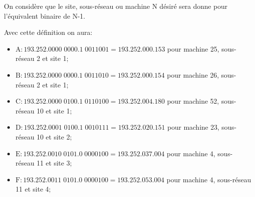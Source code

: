 \documentclass{article}
\begin{document}
\begin{resolution}
\begin{definition}
    \end{definition}
    \begin{remark}
        On considère que le site, sous-réseau ou machine N désiré sera donne pour l'équivalent binaire de N-1.
    \end{remark}
    Avec cette définition on aura:
    \begin{itemize}[noitemsep]
        \item $\boxed{\text{A} : 193.252.0000\;0000.1\;0011001 = 193.252.000.153}$ pour machine 25, sous-réseau 2 et site 1;
        \item $\boxed{\text{B} : 193.252.0000\;0000.1\;0011010 = 193.252.000.154}$ pour machine 26, sous-réseau 2 et site 1;
        \item $\boxed{\text{C} : 193.252.0000\;0100.1\;0110100 = 193.252.004.180}$ pour machine 52, sous-réseau 10 et site 1;
        \item $\boxed{\text{D} : 193.252.0001\;0100.1\;0010111 = 193.252.020.151}$ pour machine 23, sous-réseau 10 et site 2;
        \item $\boxed{\text{E} : 193.252.0010\;0101.0\;0000100 = 193.252.037.004}$ pour machine 4, sous-réseau 11 et site 3;
        \item $\boxed{\text{F} : 193.252.0011\;0101.0\;0000100 = 193.252.053.004}$ pour machine 4, sous-réseau 11 et site 4;
    \end{itemize}
\end{resolution}
\end{document}
